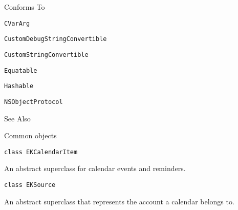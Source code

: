 \documentclass{article}
\begin{document}
Conforms To

\texttt{CVarArg}

\texttt{CustomDebugStringConvertible}

\texttt{CustomStringConvertible}

\texttt{Equatable}

\texttt{Hashable}

\texttt{NSObjectProtocol}

See Also

Common objects

\texttt{class EKCalendarItem}

An abstract superclass for calendar events and reminders.

\texttt{class EKSource}

An abstract superclass that represents the account a calendar belongs to.

\newpage
\end{document}
